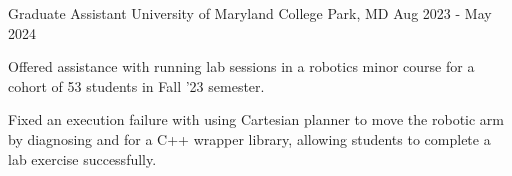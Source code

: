 \begin{work}
  {Graduate Assistant}
  {University of Maryland}
  {College Park, MD}
  {Aug 2023 - May 2024}

  \item Offered assistance with running lab sessions in a robotics minor course for a cohort of 53
        students in Fall '23 semester.

  \item Fixed an execution failure with using Cartesian planner to move the robotic arm by diagnosing
        and  for a C++ wrapper
        library, allowing students to complete a lab exercise successfully.

\end{work}
